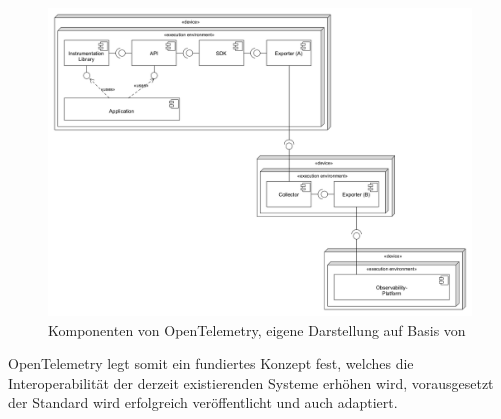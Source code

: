 \begin{figure}[H]
	\centering
	\includegraphics[width=1.00\linewidth]{img/03_methoden/otel_components.png}
	\caption{Komponenten von OpenTelemetry, eigene Darstellung auf Basis von \cite{OTelSpecification}}
	\label{fig:otel-components}
\end{figure}

OpenTelemetry legt somit ein fundiertes Konzept fest, welches die Interoperabilität der derzeit existierenden Systeme erhöhen wird, vorausgesetzt der Standard wird erfolgreich veröffentlicht und auch adaptiert.

